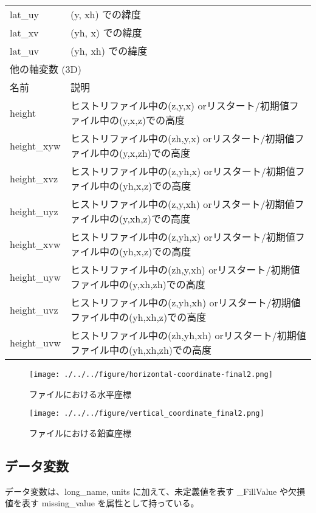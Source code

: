 \begin{longtable}{l|l}
lat\_uy & (y, xh) での緯度 \\
lat\_xv & (yh, x) での緯度 \\
lat\_uv & (yh, xh) での緯度 \\
\hline
\multicolumn{2}{l}{他の軸変数 (3D)}\\ \hline
名前 & 説明 \\ \hline \hline
height      & ヒストリファイル中の(z,y,x) orリスタート/初期値ファイル中の(y,x,z)での高度\\
height\_xyw & ヒストリファイル中の(zh,y,x) orリスタート/初期値ファイル中の(y,x,zh)での高度\\
height\_xvz & ヒストリファイル中の(z,yh,x) orリスタート/初期値ファイル中の(yh,x,z)での高度\\
height\_uyz & ヒストリファイル中の(z,y,xh) orリスタート/初期値ファイル中の(y,xh,z)での高度\\
height\_xvw & ヒストリファイル中の(z,yh,x) orリスタート/初期値ファイル中の(yh,x,z)での高度\\
height\_uyw & ヒストリファイル中の(zh,y,xh) orリスタート/初期値ファイル中の(y,xh,zh)での高度\\
height\_uvz & ヒストリファイル中の(z,yh,xh) orリスタート/初期値ファイル中の(yh,xh,z)での高度\\
height\_uvw & ヒストリファイル中の(zh,yh,xh) orリスタート/初期値ファイル中の(yh,xh,zh)での高度\\
\end{longtable}

\begin{figure}[tbh]
\begin{center}
  \texttt{[image: ./../../figure/horizontal-coordinate-final2.png]}\\
  \caption{{\scalenetcdf}ファイルにおける水平座標}
  \label{fig:netcdfhorizontalcoordinate}
\end{center}
\end{figure}
\begin{figure}[tbh]
\begin{center}
  \texttt{[image: ./../../figure/vertical\_coordinate\_final2.png]}\\
  \caption{{\scalenetcdf}ファイルにおける鉛直座標}
  \label{fig:netcdfverticalcoordinate}
\end{center}
\end{figure}

\subsection{データ変数}
データ変数は、long\_name, units に加えて、未定義値を表す \_FillValue や欠損値を表す missing\_value を属性として持っている。

